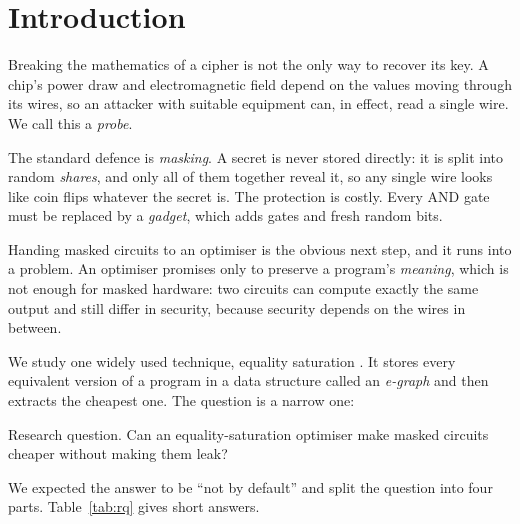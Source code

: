 \documentclass[conference]{IEEEtran}
\begin{document}
\section{Introduction}
Breaking the mathematics of a cipher is not the only way to recover its key. A chip's power draw and electromagnetic field depend on the values moving through its wires, so an attacker with suitable equipment can, in effect, read a single wire. We call this a \emph{probe}.

The standard defence is \emph{masking}. A secret is never stored directly: it is split into random \emph{shares}, and only all of them together reveal it, so any single wire looks like coin flips whatever the secret is. The protection is costly. Every AND gate must be replaced by a \emph{gadget}, which adds gates and fresh random bits.

Handing masked circuits to an optimiser is the obvious next step, and it runs into a problem. An optimiser promises only to preserve a program's \emph{meaning}, which is not enough for masked hardware: two circuits can compute exactly the same output and still differ in security, because security depends on the wires in between.

We study one widely used technique, equality saturation \cite{willsey2021egg,zhang2023egglog}. It stores every equivalent version of a program in a data structure called an \emph{e-graph} and then extracts the cheapest one. The question is a narrow one:

\begin{finding}{Research question.}
Can an equality-saturation optimiser make masked circuits cheaper without making them leak?
\end{finding}

We expected the answer to be ``not by default'' and split the question into four parts. Table~\ref{tab:rq} gives short answers.
\end{document}
